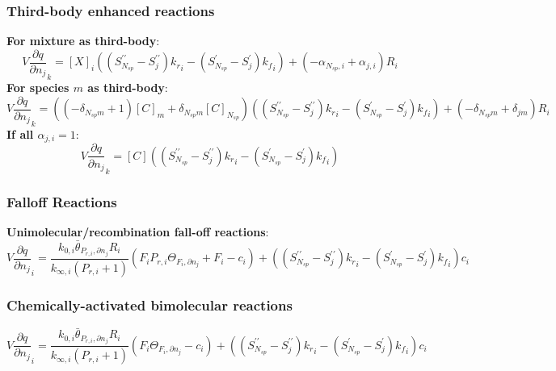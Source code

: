 \documentclass[a4paper,10pt]{article}
\newcommand{\ns}{N_{sp}}
\begin{document}
\subsubsection{Third-body enhanced reactions}
\textbf{For mixture as third-body}:
\begin{dmath} V \frac{\partial q }{\partial {n_j} }_{k} = [X]_{i} \left(\left(S^{\prime\prime}_{\ns} - S^{\prime\prime}_{j}\right) {k_r}_{i} - \left(S^{\prime}_{\ns} - S^{\prime}_{j}\right) {k_f}_{i}\right) + \left(- \alpha_{\ns,i} + \alpha_{j,i}\right) R_{i}\end{dmath} 
\textbf{For species $m$ as third-body}:
\begin{dmath} V \frac{\partial q }{\partial {n_j} }_{k} = \left(\left(- \delta_{\ns m} + 1\right) [C]_{m} + \delta_{\ns m} [C]_{\ns}\right) \left(\left(S^{\prime\prime}_{\ns} - S^{\prime\prime}_{j}\right) {k_r}_{i} - \left(S^{\prime}_{\ns} - S^{\prime}_{j}\right) {k_f}_{i}\right) + \left(- \delta_{\ns m} + \delta_{j m}\right) R_{i}\end{dmath} 
\textbf{If all $\alpha_{j,i} = 1$}:
\begin{dmath} V \frac{\partial q }{\partial {n_j} }_{k} = [C] \left(\left(S^{\prime\prime}_{\ns} - S^{\prime\prime}_{j}\right) {k_r}_{i} - \left(S^{\prime}_{\ns} - S^{\prime}_{j}\right) {k_f}_{i}\right)\end{dmath} 
\subsubsection{Falloff Reactions}
\textbf{Unimolecular\slash recombination fall-off reactions}:
\begin{dmath} V \frac{\partial q }{\partial {n_j} }_{i} = \frac{k_{0, i} \bar{\theta}_{P_{r, i}, \partial n_j} R_{i}}{k_{\infty, i} \left(P_{r, i} + 1\right)} \left(F_{i} P_{r, i} \Theta_{F_i, \partial n_j} + F_{i} - c_{i}\right) + \left(\left(S^{\prime\prime}_{\ns} - S^{\prime\prime}_{j}\right) {k_r}_{i} - \left(S^{\prime}_{\ns} - S^{\prime}_{j}\right) {k_f}_{i}\right) c_{i}\end{dmath} 
\subsubsection{Chemically-activated bimolecular reactions}
\begin{dmath} V \frac{\partial q }{\partial {n_j} }_{i} = \frac{k_{0, i} \bar{\theta}_{P_{r, i}, \partial n_j} R_{i}}{k_{\infty, i} \left(P_{r, i} + 1\right)} \left(F_{i} \Theta_{F_i, \partial n_j} - c_{i}\right) + \left(\left(S^{\prime\prime}_{\ns} - S^{\prime\prime}_{j}\right) {k_r}_{i} - \left(S^{\prime}_{\ns} - S^{\prime}_{j}\right) {k_f}_{i}\right) c_{i}\end{dmath} 
\end{document}
